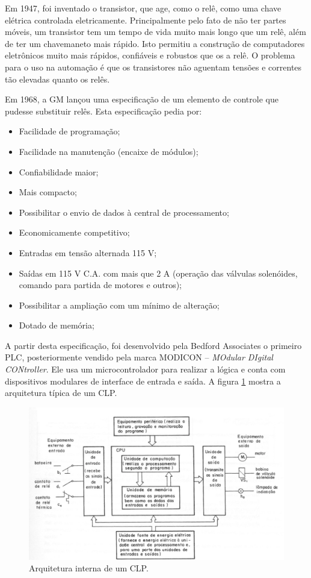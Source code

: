 Em 1947, foi inventado o transistor, que age, como o relê, como uma chave elétrica controlada eletricamente. Principalmente pelo fato de não ter partes móveis, um transistor tem um tempo de vida muito mais longo que um relê, além de ter um chavemaneto mais rápido. Isto permitiu a construção de computadores eletrônicos muito mais rápidos, confiáveis e robustos que os a relê. O problema para o uso na automação é que os transistores não aguentam tensões e correntes tão elevadas quanto os relês.

Em 1968, a GM lançou uma especificação de um elemento de controle que pudesse substituir relês. Esta especificação pedia por:
\begin{itemize}
  \item Facilidade de programação;
  \item Facilidade na manutenção (encaixe de módulos);
  \item Confiabilidade maior;
  \item Mais compacto;
  \item Possibilitar o envio de dados à central de processamento;
  \item Economicamente competitivo;
  \item Entradas em tensão alternada 115 V;
  \item Saídas  em 115 V C.A. com mais que 2 A (operação das válvulas solenóides, comando para partida de motores e outros);
  \item Possibilitar a ampliação com um mínimo de alteração;
  \item Dotado de memória;
\end{itemize}

A partir desta especificação, foi desenvolvido pela Bedford Associates o primeiro PLC, posteriormente vendido pela marca MODICON -- \emph{MOdular DIgital CONtroller}. Ele usa um microcontrolador para realizar a lógica e conta com dispositivos modulares de interface de entrada e saída. A figura \ref{fig:plc_sistema} mostra a arquitetura típica de um CLP.

\begin{figure}[hbt]
  \centering
  \includegraphics[width=\textwidth]{figuras/plc_sistema}
  \caption{Arquitetura interna de um CLP.}
  \label{fig:plc_sistema}
\end{figure}

